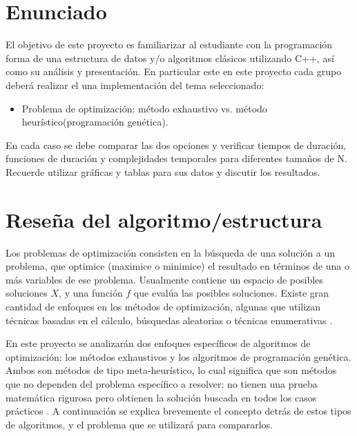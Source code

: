 

\section{Enunciado}

El objetivo de este proyecto es familiarizar al estudiante con la programación forma de una
estructura de datos y/o algoritmos clásicos utilizando C++, así como  su análisis y presentación.
En particular este en este proyecto cada grupo deberá realizar el una implementación del tema
seleccionado:

\begin{itemize}
    \item Problema de optimización: método exhaustivo vs. método heurístico(programación genética).
\end{itemize}

En cada caso se debe comparar las dos opciones y verificar tiempos de duración, funciones de duración
y complejidades temporales para diferentes tamaños de N. Recuerde utilizar gráficas y tablas para
sus datos y discutir los resultados.


\section{Reseña del algoritmo/estructura}

Los problemas de optimización consisten en la búsqueda de una solución a un problema, que optimice (maximice o minimice) el resultado en términos de una o más variables de ese problema. Usualmente contiene un espacio de posibles soluciones $X$, y una función $f$ que evalúa las posibles soluciones. Existe gran cantidad de enfoques en los métodos de optimización, algunas que utilizan técnicas basadas en el cálculo, búsquedas aleatorias o técnicas enumerativas \cite{R11}. 

En este proyecto se analizarán dos enfoques específicos de algoritmos de optimización: los métodos exhaustivos y los algoritmos de programación genética. Ambos son métodos de tipo meta-heurístico, lo cual significa que son métodos que no dependen del problema específico a resolver; no tienen una prueba matemática rigurosa pero obtienen la solución buscada en todos los casos prácticos \cite{R11}. A continuación se explica brevemente el concepto detrás de estos tipos de algoritmos, y el problema que se utilizará para compararlos.

